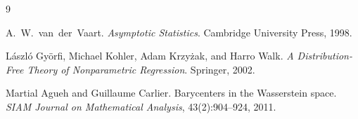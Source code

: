 \documentclass[11pt]{article}
\theoremstyle{remark}
\begin{document}




\begin{thebibliography}{9}

A.~W.\ van~der~Vaart.
\newblock \emph{Asymptotic Statistics}.
\newblock Cambridge University Press, 1998.

L{\'a}szl{\'o} Gy{\"o}rfi, Michael Kohler, Adam Krzy\.zak, and Harro Walk.
\newblock \emph{A Distribution-Free Theory of Nonparametric Regression}.
\newblock Springer, 2002.

Martial Agueh and Guillaume Carlier.
\newblock Barycenters in the Wasserstein space.
\newblock \emph{SIAM Journal on Mathematical Analysis}, 43(2):904--924, 2011.

\end{thebibliography}
\end{document}
